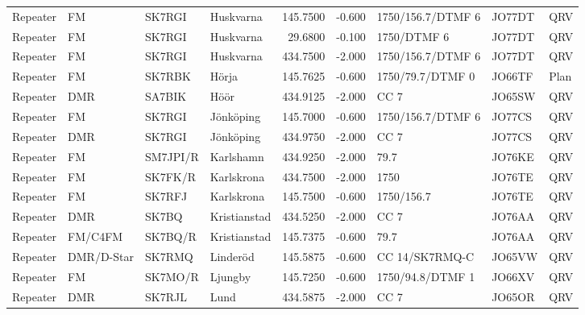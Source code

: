\begin{landscape}
\begin{longtable}{llllrrlll}
	Repeater & FM              & SK7RGI   & Huskvarna            &     145.7500 &     -0.600 & 1750/156.7/DTMF 6 & JO77DT      & QRV      \\
	Repeater & FM              & SK7RGI   & Huskvarna            &      29.6800 &     -0.100 & 1750/DTMF 6       & JO77DT      & QRV      \\
	Repeater & FM              & SK7RGI   & Huskvarna            &     434.7500 &     -2.000 & 1750/156.7/DTMF 6 & JO77DT      & QRV      \\
	Repeater & FM              & SK7RBK   & Hörja                &     145.7625 &     -0.600 & 1750/79.7/DTMF 0  & JO66TF      & Plan     \\
	Repeater & DMR             & SA7BIK   & Höör                 &     434.9125 &     -2.000 & CC 7              & JO65SW      & QRV      \\
	Repeater & FM              & SK7RGI   & Jönköping            &     145.7000 &     -0.600 & 1750/156.7/DTMF 6 & JO77CS      & QRV      \\
	Repeater & DMR             & SK7RGI   & Jönköping            &     434.9750 &     -2.000 & CC 7              & JO77CS      & QRV      \\
	Repeater & FM              & SM7JPI/R & Karlshamn            &     434.9250 &     -2.000 & 79.7              & JO76KE      & QRV      \\
	Repeater & FM              & SK7FK/R  & Karlskrona           &     434.7500 &     -2.000 & 1750              & JO76TE      & QRV      \\
	Repeater & FM              & SK7RFJ   & Karlskrona           &     145.7500 &     -0.600 & 1750/156.7        & JO76TE      & QRV      \\
	Repeater & DMR             & SK7BQ    & Kristianstad         &     434.5250 &     -2.000 & CC 7              & JO76AA      & QRV      \\
	Repeater & FM/C4FM         & SK7BQ/R  & Kristianstad         &     145.7375 &     -0.600 & 79.7              & JO76AA      & QRV      \\
	Repeater & DMR/D-Star      & SK7RMQ   & Linderöd             &     145.5875 &     -0.600 & CC 14/SK7RMQ-C    & JO65VW      & QRV      \\
	Repeater & FM              & SK7MO/R  & Ljungby              &     145.7250 &     -0.600 & 1750/94.8/DTMF 1  & JO66XV      & QRV      \\
	Repeater & DMR             & SK7RJL   & Lund                 &     434.5875 &     -2.000 & CC 7              & JO65OR      & QRV      \\

\end{longtable}
\end{landscape}
